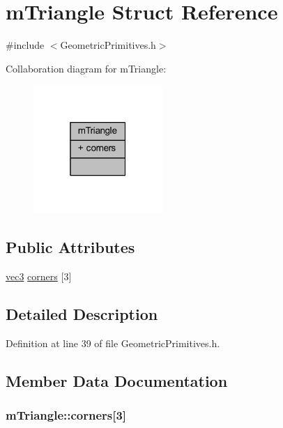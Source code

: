 \hypertarget{structm_triangle}{}\section{m\+Triangle Struct Reference}
\label{structm_triangle}


{\ttfamily \#include $<$Geometric\+Primitives.\+h$>$}



Collaboration diagram for m\+Triangle\+:\nopagebreak
\begin{figure}[H]
\begin{center}
\leavevmode
\includegraphics[width=139pt]{structm_triangle__coll__graph}
\end{center}
\end{figure}
\subsection*{Public Attributes}
\begin{DoxyCompactItemize}
\item 
\hyperlink{_types_8h_a3d0ce73e3199de81565fb01632415288}{vec3} \hyperlink{structm_triangle_a3f31b1e5611980057cbb92b7637fc434}{corners} \mbox{[}3\mbox{]}
\end{DoxyCompactItemize}


\subsection{Detailed Description}


Definition at line 39 of file Geometric\+Primitives.\+h.



\subsection{Member Data Documentation}
\subsubsection[{\texorpdfstring{corners}{corners}}]{ m\+Triangle\+::corners\mbox{[}3\mbox{]}}\hypertarget{structm_triangle_a3f31b1e5611980057cbb92b7637fc434}{}\label{structm_triangle_a3f31b1e5611980057cbb92b7637fc434}


